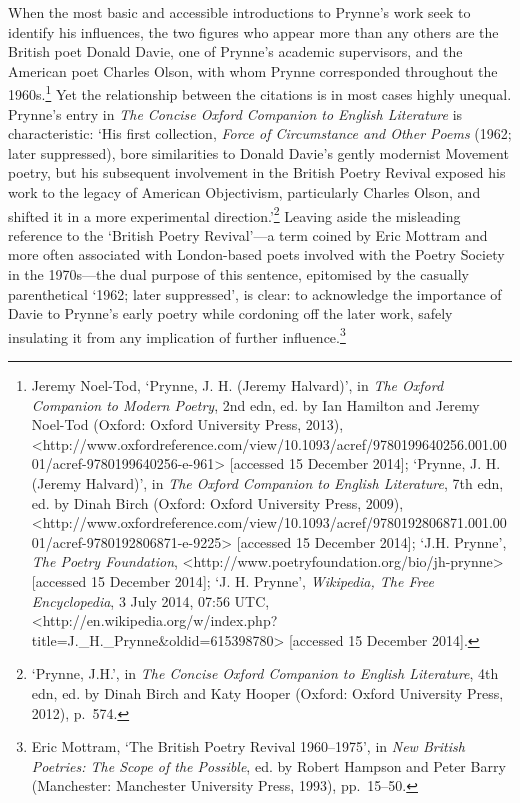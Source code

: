 \documentclass[]{article}
\begin{document}
When the most basic and accessible introductions to Prynne’s work seek
to identify his influences, the two figures who appear more than any
others are the British poet Donald Davie, one of Prynne’s academic
supervisors, and the American poet Charles Olson, with whom Prynne
corresponded throughout the 1960s.\footnote{Jeremy Noel-Tod, ‘Prynne, J.
  H. (Jeremy Halvard)’, in \emph{The Oxford Companion to Modern Poetry},
  2nd edn, ed. by Ian Hamilton and Jeremy Noel-Tod (Oxford: Oxford
  University Press, 2013),
  \textless{}http://www.oxfordreference.com\slash view\slash 10.1093\slash acref\slash 9780199640256.001.0001\slash acref-9780199640256-e-961\textgreater{}
  {[}accessed 15 December 2014{]}; ‘Prynne, J. H. (Jeremy Halvard)’, in
  \emph{The Oxford Companion to English Literature}, 7th edn, ed. by
  Dinah Birch (Oxford: Oxford University Press, 2009),
  \textless{}http://www.oxfordreference.com\slash view\slash 10.1093\slash acref\slash 9780192806871.001.0001\slash acref-9780192806871-e-9225\textgreater{}
  {[}accessed 15 December 2014{]}; ‘J.H. Prynne’, \emph{The Poetry
  Foundation},
  \textless{}http://www.poetryfoundation.org/bio/jh-prynne\textgreater{}
  {[}accessed 15 December 2014{]}; ‘J. H. Prynne’, \emph{Wikipedia, The
  Free Encyclopedia}, 3 July 2014, 07:56 UTC,
  \textless{}http://en.wikipedia.org/w/index.php?title=J.\_H.\_Prynne\&oldid=615398780\textgreater{}
  {[}accessed 15 December 2014{]}.} Yet the relationship between the
citations is in most cases highly unequal. Prynne’s entry in \emph{The
Concise Oxford Companion to English Literature} is characteristic: ‘His
first collection, \emph{Force of Circumstance and Other Poems} (1962;
later suppressed), bore similarities to Donald Davie’s gently modernist
Movement poetry, but his subsequent involvement in the British Poetry
Revival exposed his work to the legacy of American Objectivism,
particularly Charles Olson, and shifted it in a more experimental
direction.’\footnote{‘Prynne, J.H.’, in \emph{The Concise Oxford
  Companion to English Literature}, 4th edn, ed. by Dinah Birch and Katy
  Hooper (Oxford: Oxford University Press, 2012), p.~574.} Leaving aside
the misleading reference to the ‘British Poetry Revival’—a term coined
by Eric Mottram and more often associated with London-based poets
involved with the Poetry Society in the 1970s—the dual purpose of this
sentence, epitomised by the casually parenthetical ‘1962; later
suppressed’, is clear: to acknowledge the importance of Davie to
Prynne’s early poetry while cordoning off the later work, safely
insulating it from any implication of further influence.\footnote{Eric
  Mottram, ‘The British Poetry Revival 1960–1975’, in \emph{New British
  Poetries: The Scope of the Possible}, ed. by Robert Hampson and Peter
  Barry (Manchester: Manchester University Press, 1993), pp.~15–50.}
\end{document}
